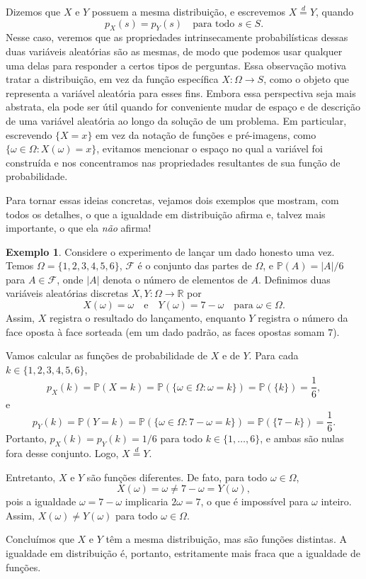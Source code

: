 \documentclass[12pt,portuguese]{article}
\theoremstyle{definition}
\newtheorem{example}[example]{Exemplo}
\begin{document}
Dizemos que \(X\) e \(Y\) possuem a mesma distribuição, e escrevemos
\(X \overset{d}{=} Y\), quando
\[
  p_X(s)=p_Y(s)\quad\text{para todo }s\in S.
\]
Nesse caso, veremos que as propriedades intrinsecamente probabilísticas dessas
duas variáveis aleatórias são as mesmas, de modo que podemos usar qualquer uma
delas para responder a certos tipos de perguntas. Essa observação motiva tratar
a distribuição, em vez da função específica \(X:\Omega\to S\), como o objeto
que representa a variável aleatória para esses fins. Embora essa perspectiva
seja mais abstrata, ela pode ser útil quando for conveniente mudar de espaço e
de descrição de uma variável aleatória ao longo da solução de um problema. Em
particular, escrevendo \(\{X=x\}\) em vez da notação de funções e pré-imagens,
como \(\{\omega\in \Omega:X(\omega)=x\}\), evitamos mencionar o espaço no qual
a variável foi construída e nos concentramos nas propriedades resultantes de
sua função de probabilidade.


\bigskip

Para tornar essas ideias concretas, vejamos dois exemplos que mostram, com todos
os detalhes, o que a igualdade em distribuição afirma e, talvez mais importante,
o que ela \emph{não} afirma!

\bigskip

\begin{example}\label{ex:dado-face-oposta}
Considere o experimento de lançar um dado honesto uma vez. Temos
$\Omega = \{1, 2, 3, 4, 5, 6\}$, $\mathcal{F}$ é o conjunto das partes de $\Omega$,
e $\mathbb{P}(A) = |A|/6$ para $A \in \mathcal{F}$, onde $|A|$ denota o número de
elementos de $A$. Definimos duas variáveis aleatórias discretas
$X, Y : \Omega \to \mathbb{R}$ por
\[
  X(\omega) = \omega \quad \text{e} \quad Y(\omega) = 7 - \omega
  \quad \text{para } \omega \in \Omega.
\]
Assim, $X$ registra o resultado do lançamento, enquanto $Y$ registra o número da
face oposta à face sorteada (em um dado padrão, as faces opostas somam $7$).


\bigskip

Vamos calcular as funções de probabilidade de $X$ e de $Y$. Para cada
$k \in \{1, 2, 3, 4, 5, 6\}$,
\[
  p_X(k) = \mathbb{P}(X = k) = \mathbb{P}(\{\omega \in \Omega : \omega = k\})
  = \mathbb{P}(\{k\}) = \frac{1}{6},
\]
e
\[
  p_Y(k) = \mathbb{P}(Y = k) = \mathbb{P}(\{\omega \in \Omega : 7 - \omega = k\})
  = \mathbb{P}(\{7 - k\}) = \frac{1}{6}.
\]
Portanto, $p_X(k) = p_Y(k) = 1/6$ para todo $k \in \{1, \dots, 6\}$, e ambas são
nulas fora desse conjunto. Logo, $X \overset{d}{=} Y$.

Entretanto, $X$ e $Y$ são funções diferentes. De fato, para todo $\omega \in \Omega$,
\[
  X(\omega) = \omega \neq 7 - \omega = Y(\omega),
\]
pois a igualdade $\omega = 7 - \omega$ implicaria $2\omega = 7$, o que é impossível
para $\omega$ inteiro. Assim, $X(\omega) \neq Y(\omega)$ para todo $\omega \in \Omega$.

Concluímos que $X$ e $Y$ têm a mesma distribuição, mas são funções distintas. A
igualdade em distribuição é, portanto, estritamente mais fraca que a igualdade de funções.
\end{example}
\end{document}
